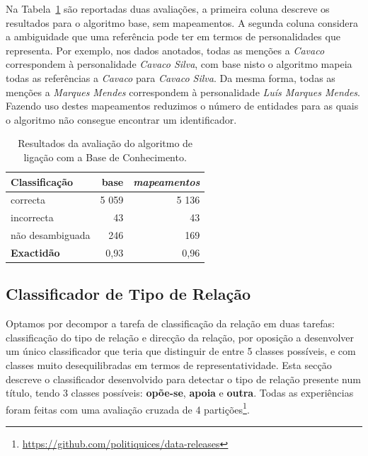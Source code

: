 \documentclass[a4paper, twocolumn, 11pt, twoside]{article}
\begin{document}
Na Tabela~\ref{tab:ent_linking_results} são reportadas duas avaliações, a primeira coluna descreve os resultados para o algoritmo base, sem mapeamentos. A segunda coluna considera a ambiguidade que uma referência pode ter em termos de personalidades que representa. Por exemplo, nos dados anotados, todas as menções a \textit{Cavaco} correspondem à personalidade \textit{Cavaco Silva}, com base nisto o algoritmo mapeia todas as referências a \textit{Cavaco} para \textit{Cavaco Silva}. Da mesma forma, todas as menções a \textit{Marques Mendes} correspondem à personalidade \textit{Luís Marques Mendes}. Fazendo uso destes mapeamentos reduzimos o número de entidades para as quais o algoritmo não consegue encontrar um identificador.

\begin{table}[!h]
    \begin{center}
    \begin{tabular}{l rr}
        {\bf Classificação} & {\bf base} & \it{{\bf mapeamentos}} \\
        \hline
        correcta            &   5 059    &  5 136   \\
        incorrecta          &      43    &     43   \\
		não desambiguada    &     246    &    169   \\    
        \hline
		{\bf Exactidão }    &    0,93	 &  0,96   \\
    \end{tabular}
	\caption{Resultados da avaliação do algoritmo de ligação com a Base de Conhecimento.}
	\label{tab:ent_linking_results}
	\end{center}
\end{table}

\subsection{Classificador de Tipo de Relação}
\label{subsec:rel_classifier}

Optamos por decompor a tarefa de classificação da relação em duas tarefas: classificação do tipo de relação e direcção da relação, por oposição a desenvolver um único classificador que teria que distinguir de entre 5 classes possíveis, e com classes muito desequilibradas em termos de representatividade. Esta secção descreve o classificador desenvolvido para detectar o tipo de relação presente num título, tendo 3 classes possíveis: \textbf{opõe-se}, \textbf{apoia} e \textbf{outra}. Todas as experiências foram feitas com uma avaliação cruzada de 4 partições\footnote{\url{https://github.com/politiquices/data-releases}}.
\end{document}
